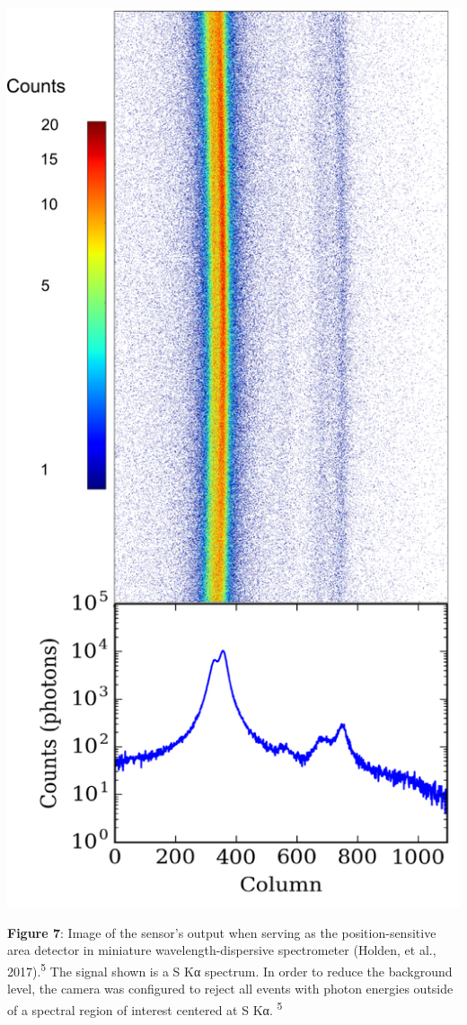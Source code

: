\begin{center}
\includegraphics{NewCameraPaper_1.10.docx1502867018/media/image7.png}
\end{center}

\textbf{Figure 7}: Image of the sensor's output when serving as the
position-sensitive area detector in miniature wavelength-dispersive
spectrometer (Holden, et al., 2017).\textsuperscript{5} The signal shown
is a S Kα spectrum. In order to reduce the background level, the camera
was configured to reject all events with photon energies outside of a
spectral region of interest centered at S Kα. \textsuperscript{5}
\bigbreak

